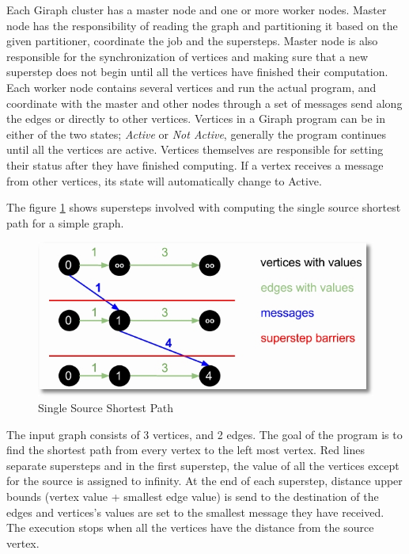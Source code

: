 \documentclass[english]{tktltiki}
\begin{document}
Each Giraph cluster has a master node and one or more worker nodes. Master node has the responsibility of reading the graph and partitioning it based on the given partitioner, coordinate the job and the supersteps. Master node is also responsible for the synchronization of vertices and making sure that a new superstep does not begin until all the vertices have finished their computation. Each worker node contains several vertices and run the actual program, and coordinate with the master and other nodes through a set of messages send along the edges or directly to other vertices. Vertices in a Giraph program can be in either of the two states; \textit{Active} or \textit{Not Active}, generally the program continues until all the vertices are active. Vertices themselves are responsible for setting their status after they have finished computing. If a vertex receives a message from other vertices, its state will automatically change to Active.

The figure \ref{fig:sssp} shows supersteps involved with computing the single source shortest path for a simple graph.
\begin{figure}[ht!]
\centering
\includegraphics[width=150mm]{figures/giraphsuperstep.jpg}
\caption{Single Source Shortest Path  \protect \footnotemark}
\label{fig:sssp}
\end{figure}

The input graph consists of 3 vertices, and 2 edges. The goal of the program is to find the shortest path from every vertex to the left most vertex. Red lines separate supersteps and in the first superstep, the value of all the vertices except for the source is assigned to infinity. At the end of each superstep, distance upper bounds (vertex value + smallest edge value) is send to the destination of the edges and vertices's values are set to the smallest message they have received. The execution stops when all the vertices have the distance from the source vertex. 
\end{document}
